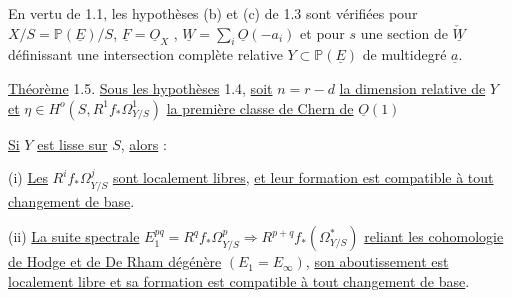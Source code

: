 En vertu de 1.1, les hypothèses (b) et (c) de 1.3 sont vérifiées pour $X/S = \mathbb{P}(\underline{E})/S$, $\underline{F} = \underline{O}_X$ , $\underline{W} = \sum\limits_i \underline{O}(-a_i)$ et pour $s$ une section de $\check{\underline{W}}$ définissant une intersection complète relative $Y \subset \mathbb{P}(\underline{E})$ de multidegré $\underline{a}$.

\underline{Théorème} 1.5. \underline{Sous les hypothèses} 1.4, \underline{soit} $n = r-d$ \underline{la dimension relative de} $Y$ \underline{et} $\eta \in H^o(S,R^1f_*\Omega^1_{Y/S})$ \underline{la première classe de Chern de} $\underline{O}(1)$

\begin{center}
\end{center}
\underline{Si} $Y$ \underline{est lisse sur} $S$, \underline{alors} :

(i) \underline{Les} $R^i f_* \Omega^j_{Y/S}$ \underline{sont localement libres}, \underline{et leur formation est compatible à tout changement de base}.

(ii) \underline{La suite spectrale} $E_1^{pq} = R^q f_* \Omega^p_{Y/S} \Longrightarrow R^{p+q} f_*(\Omega^*_{Y/S})$ \underline{reliant les cohomologie de Hodge et de De Rham dégénère} $(E_1 = E_\infty)$, \underline{son aboutissement est localement libre et sa formation est compatible à tout changement de base}.


